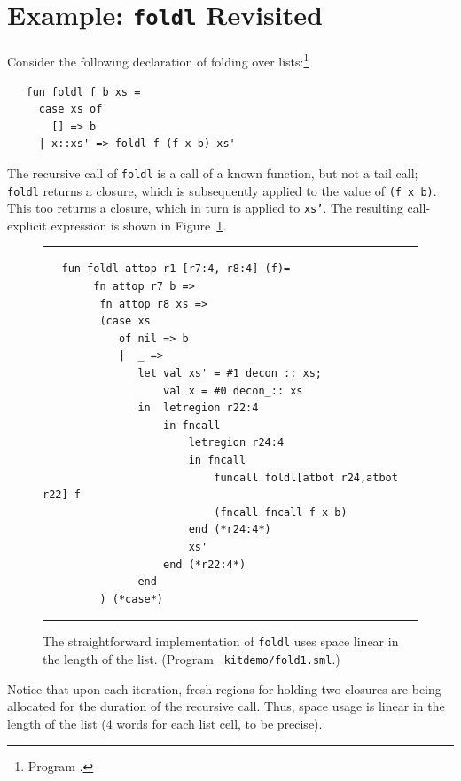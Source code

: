 \documentclass[12pt]{book}
\begin{document}
\section{Example: \texttt{foldl}  Revisited}
\label{foldl.sec}
Consider the following declaration of folding over
lists:\footnote{Program .}
\begin{verbatim}
   fun foldl f b xs = 
     case xs of 
       [] => b
     | x::xs' => foldl f (f x b) xs'
\end{verbatim}
The recursive call of 
%
{\tt foldl} is a call of a known function, but not a tail call; {\tt
  foldl} returns a closure, which is subsequently applied to the value
of {\tt (f x b)}. This too returns a closure, which in turn is applied
to {\tt xs'}.  The resulting call-explicit expression is shown in
Figure~\ref{fold1.fig}.
\begin{figure}
\hrule \medskip
\begin{verbatim}
   fun foldl attop r1 [r7:4, r8:4] (f)= 
        fn attop r7 b => 
         fn attop r8 xs => 
         (case xs 
            of nil => b
            |  _ => 
               let val xs' = #1 decon_:: xs; 
                   val x = #0 decon_:: xs
               in  letregion r22:4 
                   in fncall 
                       letregion r24:4 
                       in fncall 
                           funcall foldl[atbot r24,atbot r22] f 
                           (fncall fncall f x b) 
                       end (*r24:4*) 
                       xs' 
                   end (*r22:4*)
               end 
         ) (*case*) 
\end{verbatim}
\caption{The straightforward implementation of {\tt foldl} uses space 
  linear in the length of the list. (Program {\tt
    kitdemo/fold1.sml}.)}  
\medskip \hrule \label{fold1.fig}
\end{figure}
Notice that upon each iteration, fresh regions for holding two
closures are being allocated for the duration of the recursive call.
Thus, space usage is linear in the length of the list (4 words for
each list cell, to be precise).
\end{document}
